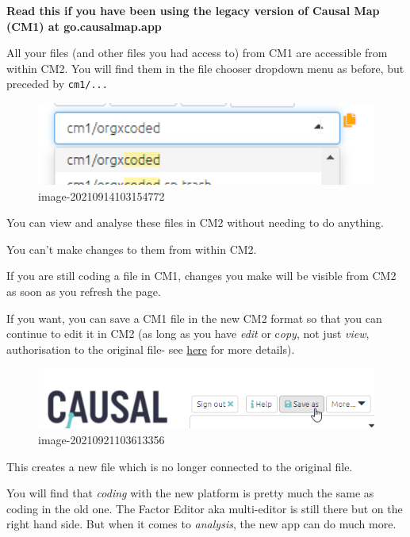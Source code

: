 \documentclass[
]{book}
\begin{document}
\textbf{Read this if you have been using the legacy version of Causal Map (CM1) at go.causalmap.app}

All your files (and other files you had access to) from CM1 are accessible from within CM2. You will find them in the file chooser dropdown menu as before, but preceded by \texttt{cm1/...}

\begin{figure}
\centering
\includegraphics[width=6.77083in,height=\textheight]{_assets/image-20210914103154772.png}
\caption{image-20210914103154772}
\end{figure}

You can view and analyse these files in CM2 without needing to do anything.

You can't make changes to them from within CM2.

If you are still coding a file in CM1, changes you make will be visible from CM2 as soon as you refresh the page.

If you want, you can save a CM1 file in the new CM2 format so that you can continue to edit it in CM2 (as long as you have \emph{edit} or c\emph{opy}, not just \emph{view}, authorisation to the original file- see \protect\hyperlink{xpermissions}{here} for more details).

\begin{figure}
\centering
\includegraphics[width=6.77083in,height=\textheight]{_assets/image-20210921103613356.png}
\caption{image-20210921103613356}
\end{figure}

This creates a new file which is no longer connected to the original file.

You will find that \emph{coding} with the new platform is pretty much the same as coding in the old one. The Factor Editor aka multi-editor is still there but on the right hand side. But when it comes to \emph{analysis}, the new app can do much more.
\end{document}
